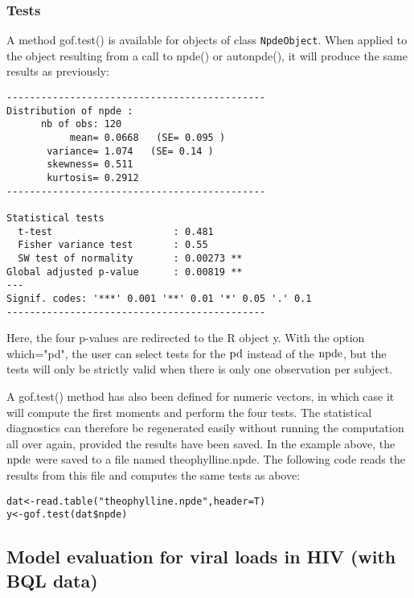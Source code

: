 \subsubsection{Tests}

\hskip 18pt A method {\sf gof.test()} is available for objects of class \texttt{NpdeObject}. When applied to the object resulting from a call to {\sf npde()} or {\sf autonpde()}, it will produce the same results as previously:
\begin{verbatim}
---------------------------------------------
Distribution of npde :
      nb of obs: 120 
           mean= 0.0668   (SE= 0.095 )
       variance= 1.074   (SE= 0.14 )
       skewness= 0.511 
       kurtosis= 0.2912 
---------------------------------------------

Statistical tests
  t-test                     : 0.481
  Fisher variance test       : 0.55
  SW test of normality       : 0.00273 **
Global adjusted p-value      : 0.00819 **
---
Signif. codes: '***' 0.001 '**' 0.01 '*' 0.05 '.' 0.1 
---------------------------------------------
\end{verbatim}
Here, the four p-values are redirected to the R object {\sf y}. With the option {\sf which="pd"}, the user can select tests for the ${\rm pd}$ instead of the ${\rm npde}$, but the tests will only be strictly valid when there is only one observation per subject.

A {\sf gof.test()} method has also been defined for numeric vectors, in which case it will compute the first moments and perform the four tests. The statistical diagnostics can therefore be regenerated easily without running the computation all over again, provided the results have been saved. In the example above, the ${\rm npde}$ were saved to a file named {\sf theophylline.npde}. The following code reads the results from this file and computes the same tests as above:
\begin{verbatim}
dat<-read.table("theophylline.npde",header=T)
y<-gof.test(dat$npde) 
\end{verbatim}


\clearpage

\subsection{Model evaluation for viral loads in HIV (with BQL data)} \label{sec:PDexample}

